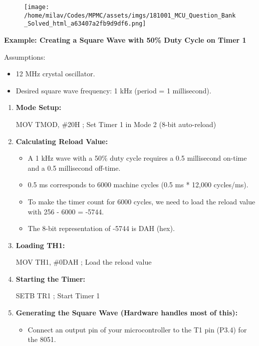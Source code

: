 \documentclass[
]{article}
\newenvironment{Shaded}{}{}
\newcommand{\NormalTok}[1]{#1}
\begin{document}
\begin{figure}
\centering
\texttt{[image: /home/milav/Codes/MPMC/assets/imgs/181001\_MCU\_Question\_Bank\_Solved\_html\_a63407a2fb9d9df6.png]}
\caption{}
\end{figure}

\textbf{Example: Creating a Square Wave with 50\% Duty Cycle on Timer 1}

Assumptions:

\begin{itemize}
\item
  12 MHz crystal oscillator.
\item
  Desired square wave frequency: 1 kHz (period = 1 millisecond).
\end{itemize}

\begin{enumerate}
\def\labelenumi{\arabic{enumi}.}
\item
  \textbf{Mode Setup:}

\begin{Shaded}
\begin{Highlighting}[]
\NormalTok{MOV TMOD, \#20H ; Set Timer 1 in Mode 2 (8{-}bit auto{-}reload)}
\end{Highlighting}
\end{Shaded}
\item
  \textbf{Calculating Reload Value:}

  \begin{itemize}
  \item
    A 1 kHz wave with a 50\% duty cycle requires a 0.5 millisecond
    on-time and a 0.5 millisecond off-time.
  \item
    0.5 ms corresponds to 6000 machine cycles (0.5 ms * 12,000
    cycles/ms).
  \item
    To make the timer count for 6000 cycles, we need to load the reload
    value with 256 - 6000 = -5744.
  \item
    The 8-bit representation of -5744 is DAH (hex).
  \end{itemize}
\item
  \textbf{Loading TH1:}

\begin{Shaded}
\begin{Highlighting}[]
\NormalTok{MOV TH1, \#0DAH ; Load the reload value}
\end{Highlighting}
\end{Shaded}
\item
  \textbf{Starting the Timer:}

\begin{Shaded}
\begin{Highlighting}[]
\NormalTok{SETB TR1 ; Start Timer 1}
\end{Highlighting}
\end{Shaded}
\item
  \textbf{Generating the Square Wave (Hardware handles most of this):}

  \begin{itemize}
  \item
    Connect an output pin of your microcontroller to the T1 pin (P3.4)
    for the 8051.
  \end{itemize}
\end{enumerate}
\end{document}

